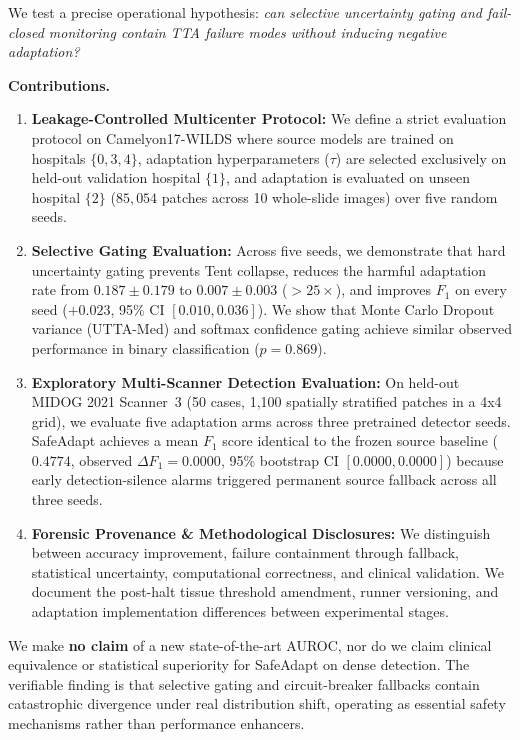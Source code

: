 \documentclass[conference]{IEEEtran}
\begin{document}
We test a precise operational hypothesis: \emph{can selective uncertainty gating and fail-closed monitoring contain TTA failure modes without inducing negative adaptation?}

\textbf{Contributions.}
\begin{enumerate}
\item \textbf{Leakage-Controlled Multicenter Protocol:} We define a strict evaluation protocol on Camelyon17-WILDS where source models are trained on hospitals $\{0,3,4\}$, adaptation hyperparameters ($\tau$) are selected exclusively on held-out validation hospital $\{1\}$, and adaptation is evaluated on unseen hospital $\{2\}$ ($85{,}054$ patches across 10 whole-slide images) over five random seeds.
\item \textbf{Selective Gating Evaluation:} Across five seeds, we demonstrate that hard uncertainty gating prevents Tent collapse, reduces the harmful adaptation rate from $0.187 \pm 0.179$ to $0.007 \pm 0.003$ ($>25\times$), and improves $F_1$ on every seed ($+0.023$, 95\% CI $[0.010, 0.036]$). We show that Monte Carlo Dropout variance (UTTA-Med) and softmax confidence gating achieve similar observed performance in binary classification ($p=0.869$).
\item \textbf{Exploratory Multi-Scanner Detection Evaluation:} On held-out MIDOG 2021 Scanner~3 (50 cases, 1,100 spatially stratified patches in a 4x4 grid), we evaluate five adaptation arms across three pretrained detector seeds. SafeAdapt achieves a mean $F_1$ score identical to the frozen source baseline ($0.4774$, observed $\Delta F_1 = 0.0000$, 95\% bootstrap CI $[0.0000, 0.0000]$) because early detection-silence alarms triggered permanent source fallback across all three seeds.
\item \textbf{Forensic Provenance \& Methodological Disclosures:} We distinguish between accuracy improvement, failure containment through fallback, statistical uncertainty, computational correctness, and clinical validation. We document the post-halt tissue threshold amendment, runner versioning, and adaptation implementation differences between experimental stages.
\end{enumerate}

We make \textbf{no claim} of a new state-of-the-art AUROC, nor do we claim clinical equivalence or statistical superiority for SafeAdapt on dense detection.
The verifiable finding is that selective gating and circuit-breaker fallbacks contain catastrophic divergence under real distribution shift, operating as essential safety mechanisms rather than performance enhancers.
\end{document}
